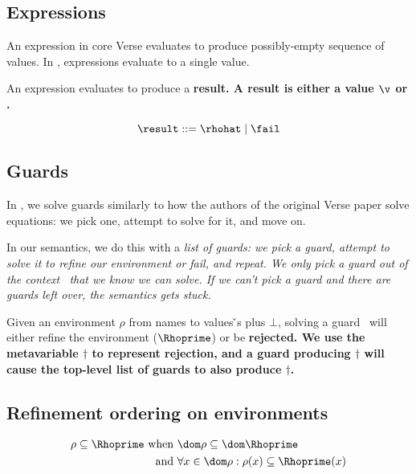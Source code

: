 \documentclass[manuscript,screen,review, 12pt, nonacm]{acmart}
\begin{document}
\bigskip
    
    \subsection{Expressions}
    
    \newcommand\GNoTree{\vmrung \rightsquigarrow \uppsidown} 
    
    An expression in core Verse evaluates to produce possibly-empty sequence of
    values. In \VMinus, expressions evaluate to a single value. 

    An expression evaluates to produce a \bf{result}. A result is either a
    value $\v$ or \fail. 
    
    \[\result\; \rm{::=}\; \rhohat\; \vert \; \fail \]
    
\subsection{Guards}

In \VMinus, we solve guards similarly to how the authors of the original Verse
paper solve equations: we pick one, attempt to solve for it, and move on. 

In our semantics, we do this with a \it{list} of guards: we pick a guard,
attempt to solve it to refine our environment or fail, and repeat. We only pick
a guard out of the context \context\ that we know we can solve. If we can't pick
a guard and there are guards left over, the semantics gets stuck.

Given an environment $\rho$ from names to values {\v}s plus $\bot$, solving a
guard \g\ will either refine the environment ($\Rhoprime$) or be \bf{rejected}.
We use the metavariable $\dagger$ to represent rejection, and a guard producing
$\dagger$ will cause the top-level list of guards to also produce $\dagger$. 

    \gfail

    \subsection{Refinement ordering on environments}

    \begin{align*}
    \rho \subseteq \Rhoprime \text{ when }&\dom\rho  \subseteq \dom \Rhoprime\\
    \text{ and } &\forall x \in \dom \rho: \rho(x) \subseteq \Rhoprime(x)
    \end{align*}
    
\end{document}
